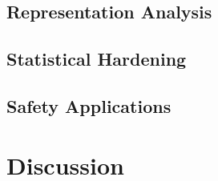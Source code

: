 \documentclass{article}
\begin{document}


\subsection{Representation Analysis}




\subsection{Statistical Hardening}





\subsection{Safety Applications}





\section{Discussion}
\end{document}
